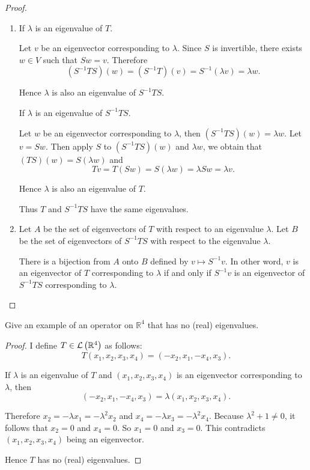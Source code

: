 \begin{proof}
    \begin{enumerate}[label={(\alph*)}]
        \item If $\lambda$ is an eigenvalue of $T$.

              Let $v$ be an eigenvector corresponding to $\lambda$. Since $S$ is invertible, there exists $w\in V$ such that $Sw = v$. Therefore
              \[
                  (S^{-1}TS)(w) = (S^{-1}T)(v) = S^{-1}(\lambda v) = \lambda w.
              \]

              Hence $\lambda$ is also an eigenvalue of $S^{-1}TS$.

              If $\lambda$ is an eigenvalue of $S^{-1}TS$.

              Let $w$ be an eigenvector corresponding to $\lambda$, then $(S^{-1}TS)(w) = \lambda w$. Let $v = Sw$. Then apply $S$ to $(S^{-1}TS)(w)$ and $\lambda w$, we obtain that $(TS)(w) = S(\lambda w)$ and
              \[
                  Tv = T(Sw) = S(\lambda w) = \lambda Sw = \lambda v.
              \]

              Hence $\lambda$ is also an eigenvalue of $T$.

              Thus $T$ and $S^{-1}TS$ have the same eigenvalues.
        \item Let $A$ be the set of eigenvectors of $T$ with respect to an eigenvalue $\lambda$. Let $B$ be the set of eigenvectors of $S^{-1}TS$ with respect to the eigenvalue $\lambda$.

              There is a bijection from $A$ onto $B$ defined by $v\mapsto S^{-1}v$. In other word, $v$ is an eigenvector of $T$ corresponding to $\lambda$ if and only if $S^{-1}v$ is an eigenvector of $S^{-1}TS$ corresponding to $\lambda$.
    \end{enumerate}
\end{proof}
\newpage

\begin{exercise}
    Give an example of an operator on $\mathbb{R}^{4}$ that has no (real) eigenvalues.
\end{exercise}

\begin{proof}
    I define $T\in\mathcal{L}\left({\mathbb{R}^{4}}\right)$ as follows:
    \[
        T(x_{1}, x_{2}, x_{3}, x_{4}) = (-x_{2}, x_{1}, -x_{4}, x_{3}).
    \]

    If $\lambda$ is an eigenvalue of $T$ and $(x_{1}, x_{2}, x_{3}, x_{4})$ is an eigenvector corresponding to $\lambda$, then
    \[
        (-x_{2}, x_{1}, -x_{4}, x_{3}) = \lambda (x_{1}, x_{2}, x_{3}, x_{4}).
    \]

    Therefore $x_{2} = -\lambda x_{1} = -\lambda^{2}x_{2}$ and $x_{4} = -\lambda x_{3} = -\lambda^{2}x_{4}$. Because $\lambda^{2} + 1\ne 0$, it follows that $x_{2} = 0$ and $x_{4} = 0$. So $x_{1} = 0$ and $x_{3} = 0$. This contradicts $(x_{1}, x_{2}, x_{3}, x_{4})$ being an eigenvector.

    Hence $T$ has no (real) eigenvalues.
\end{proof}
\newpage

